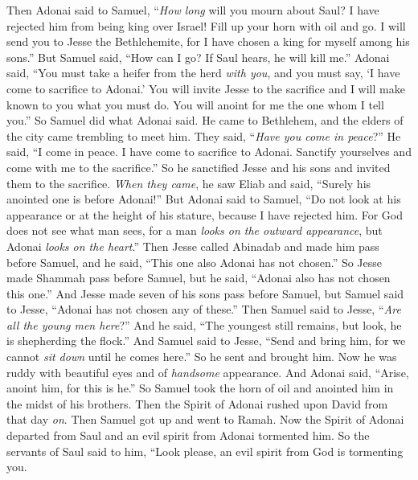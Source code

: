 \begin{biblechapter} %
 Then Adonai said to Samuel, “\textit{How long} will you mourn about Saul? I have rejected him from being king over Israel! Fill up your horn with oil and go. I will send you to Jesse the Bethlehemite, for I have chosen a king for myself among his sons.”
\verse But Samuel said, “How can I go? If Saul hears, he will kill me.” Adonai said, “You must take a heifer from the herd \textit{with you}, and you must say, ‘I have come to sacrifice to Adonai.’
\verse You will invite Jesse to the sacrifice and I will make known to you what you must do. You will anoint for me the one whom I tell you.”
\verse So Samuel did what Adonai said. He came to Bethlehem, and the elders of the city came trembling to meet him. They said, “\textit{Have you come in peace}?”
\verse He said, “I come in peace. I have come to sacrifice to Adonai. Sanctify yourselves and come with me to the sacrifice.” So he sanctified Jesse and his sons and invited them to the sacrifice.
\verse \textit{When they came}, he saw Eliab and said, “Surely his anointed one is before Adonai!”
\verse But Adonai said to Samuel, “Do not look at his appearance or at the height of his stature, because I have rejected him. For God does not see what man sees, for a man \textit{looks on the outward appearance}, but Adonai \textit{looks on the heart}.”
\verse Then Jesse called Abinadab and made him pass before Samuel, and he said, “This one also Adonai has not chosen.”
\verse So Jesse made Shammah pass before Samuel, but he said, “Adonai also has not chosen this one.”
\verse And Jesse made seven of his sons pass before Samuel, but Samuel said to Jesse, “Adonai has not chosen any of these.”
\verse Then Samuel said to Jesse, “\textit{Are all the young men here}?” And he said, “The youngest still remains, but look, he is shepherding the flock.” And Samuel said to Jesse, “Send and bring him, for we cannot \textit{sit down} until he comes here.”
\verse So he sent and brought him. Now he was ruddy with beautiful eyes and of \textit{handsome} appearance. And Adonai said, “Arise, anoint him, for this is he.”
\verse So Samuel took the horn of oil and anointed him in the midst of his brothers. Then the Spirit of Adonai rushed upon David from that day \textit{on}. Then Samuel got up and went to Ramah.
 Now the Spirit of Adonai departed from Saul and an evil spirit from Adonai tormented him.
\verse So the servants of Saul said to him, “Look please, an evil spirit from God is tormenting you.

\end{biblechapter}

